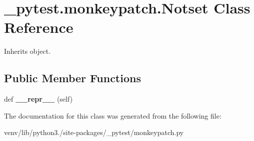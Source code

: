 \hypertarget{class__pytest_1_1monkeypatch_1_1_notset}{}\section{\+\_\+pytest.\+monkeypatch.\+Notset Class Reference}
\label{class__pytest_1_1monkeypatch_1_1_notset}


Inherits object.

\subsection*{Public Member Functions}
\begin{DoxyCompactItemize}
\item 
\mbox{\label{class__pytest_1_1monkeypatch_1_1_notset_accfa50be9f1d545312ac8283716c6437}} 
def {\bfseries \+\_\+\+\_\+repr\+\_\+\+\_\+} (self)
\end{DoxyCompactItemize}


The documentation for this class was generated from the following file\+:\begin{DoxyCompactItemize}
\item 
venv/lib/python3./site-\/packages/\+\_\+pytest/monkeypatch.\+py\end{DoxyCompactItemize}
